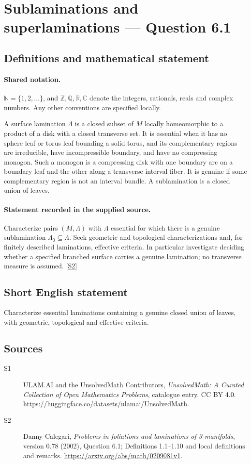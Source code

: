 \documentclass[11pt]{article}
\newcommand{\sref}[2]{\hyperlink{source:#1:#2}{[S#2]}}
\begin{document}
\section{Sublaminations and superlaminations — Question 6.1}\label{statement}

\subsection{Definitions and mathematical statement}

\paragraph{Shared notation.}$\mathbb N=\{1,2,\ldots\}$, and $\mathbb Z,\mathbb Q,\mathbb R,\mathbb C$ denote the integers, rationals, reals and complex numbers. Any other conventions are specified locally.


A surface lamination $\Lambda$ is a closed subset of $M$ locally homeomorphic to a product of a disk with a closed transverse set. It is essential when it has no sphere leaf or torus leaf bounding a solid torus, and its complementary regions are irreducible, have incompressible boundary, and have no compressing monogon. Such a monogon is a compressing disk with one boundary arc on a boundary leaf and the other along a transverse interval fiber. It is genuine if some complementary region is not an interval bundle. A sublamination is a closed union of leaves.
\paragraph{Statement recorded in the supplied source.}
Characterize pairs $(M,\Lambda)$ with $\Lambda$ essential for which there is a genuine sublamination $\Lambda_0\subseteq\Lambda$. Seek geometric and topological characterizations and, for finitely described laminations, effective criteria. In particular investigate deciding whether a specified branched surface carries a genuine lamination; no transverse measure is assumed. \sref{statement}{2}
\subsection{Short English statement}
Characterize essential laminations containing a genuine closed union of leaves, with geometric, topological and effective criteria.
\subsection{Sources}
\begin{description}
\item[\hypertarget{source:statement:1}{S1}] ULAM.AI and the UnsolvedMath Contributors, \emph{UnsolvedMath: A Curated Collection of Open Mathematics Problems}, catalogue entry. CC BY 4.0. \url{https://huggingface.co/datasets/ulamai/UnsolvedMath}.
\item[\hypertarget{source:statement:2}{S2}] Danny Calegari, \emph{Problems in foliations and laminations of 3-manifolds}, version 0.78 (2002), Question 6.1; Definitions 1.1--1.10 and local definitions and remarks. \url{https://arxiv.org/abs/math/0209081v1}.
\end{description}
\label{end:statement}
\end{document}
